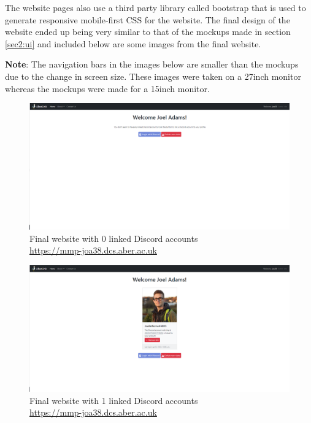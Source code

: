 The website pages also use a third party library called bootstrap \cite{bootstrap} that is used to generate responsive mobile-first CSS for the website. The final design of the website ended up being very similar to that of the mockups made in section \ref{sec2:ui} and included below are some images from the final website.

\textbf{Note}: The navigation bars in the images below are smaller than the mockups due to the change in screen size. These images were taken on a 27inch monitor whereas the mockups were made for a 15inch monitor.

\begin{figure}[H]
	\centering
	\includegraphics[width=1\linewidth]{Figures/website-acc-0.png}
	\caption{Final website with 0 linked Discord accounts \\\centering\href{https://mmp-joa38.dcs.aber.ac.uk}{https://mmp-joa38.dcs.aber.ac.uk}}
	\label{fig:final-web-acc-0}
\end{figure}

\begin{figure}[H]
	\centering
	\includegraphics[width=1\linewidth]{Figures/website-acc-1.png}
	\caption{Final website with 1 linked Discord accounts \\\centering\href{https://mmp-joa38.dcs.aber.ac.uk}{https://mmp-joa38.dcs.aber.ac.uk}}
	\label{fig:final-web-acc-1}
\end{figure}

